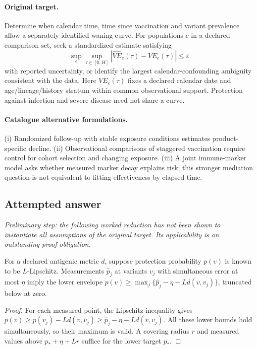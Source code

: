 \documentclass[11pt]{article}
\begin{document}
\paragraph{Original target.}
Determine when calendar time, time since vaccination and variant prevalence allow a separately identified waning curve. For populations $e$ in a declared comparison set, seek a standardized estimate satisfying
    \[\sup_{e}\sup_{\tau\in[0,H]}\left|\widehat{VE}_e(\tau)-VE_e(\tau)\right|\leq\varepsilon\]
    with reported uncertainty, or identify the largest calendar-confounding ambiguity consistent with the data. Here $VE_e(\tau)$ fixes a declared calendar date and age/lineage/history stratum within common observational support. Protection against infection and severe disease need not share a curve.
\paragraph{Catalogue alternative formulations.}
(i) Randomized follow-up with stable exposure conditions estimates product-specific decline. (ii) Observational comparisons of staggered vaccination require control for cohort selection and changing exposure. (iii) A joint immune-marker model asks whether measured marker decay explains risk; this stronger mediation question is not equivalent to fitting effectiveness by elapsed time.
\subsection{Attempted answer}
\noindent\emph{Preliminary step: the following worked reduction has not been shown to instantiate all assumptions of the original target. Its applicability is an outstanding proof obligation.}

\begin{proposition}
For a declared antigenic metric $d$, suppose protection probability $p(v)$ is known to be $L$-Lipschitz. Measurements $\widehat p_j$ at variants $v_j$ with simultaneous error at most $\eta$ imply the lower envelope $p(v)\geq\max_j\{\widehat p_j-\eta-Ld(v,v_j)\}$, truncated below at zero.
\end{proposition}
\begin{proof}
For each measured point, the Lipschitz inequality gives $p(v)\geq p(v_j)-Ld(v,v_j)\geq\widehat p_j-\eta-Ld(v,v_j)$. All these lower bounds hold simultaneously, so their maximum is valid. A covering radius $r$ and measured values above $p_*+\eta+Lr$ suffice for the lower target $p_*$.
\end{proof}
\end{document}
